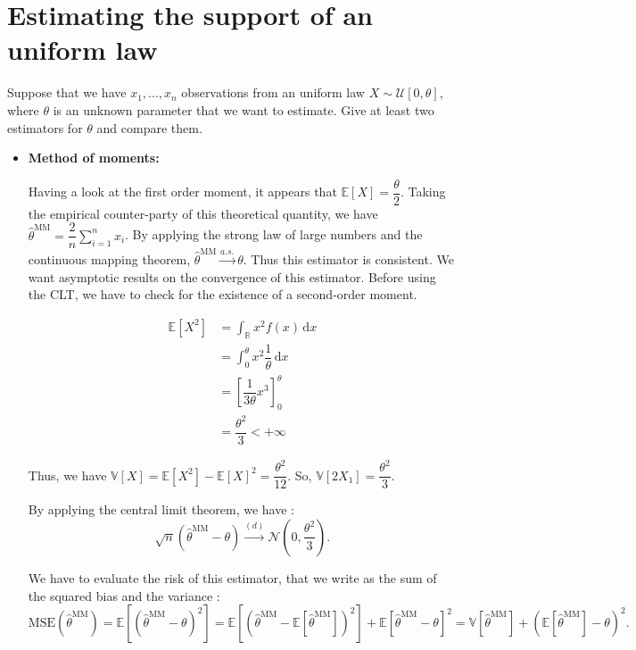 \section{Estimating the support of an uniform law}

\begin{tcolorbox}[width=\linewidth, sharp corners=all, colback=white!95!black]
Suppose that we have $x_1,\dots,x_n$ observations from an uniform law $X \sim \mathcal{U}[0,\theta]$, where $\theta$ is an unknown parameter that we want to estimate. Give at least two estimators for $\theta$ and compare them.
\end{tcolorbox}

\begin{itemize}

\item \textbf{Method of moments:}

Having a look at the first order moment, it appears that $\mathbb{E}[X] = \dfrac{\theta}{2}$. Taking the empirical counter-party of this theoretical quantity, we have $\hat{\theta}^{\text{MM}} = \dfrac{2}{n}\sum\limits_{i=1}^n x_i$.\newline
By applying the strong law of large numbers and the continuous mapping theorem, $\hat{\theta}^{\text{MM}} \xrightarrow{a.s.} \theta$. Thus this estimator is consistent.\newline
We want asymptotic results on the convergence of this estimator. Before using the CLT, we have to check for the existence of a second-order moment.

\begin{align*}
    \mathbb{E}[X^2] &= \displaystyle \int_{\mathbb{R}} x^2 f(x) \, \mathrm{d}x \\
    &= \displaystyle \int_{0}^{\theta} x^2 \dfrac{1}{\theta} \, \mathrm{d}x \\
    &= \left[ \dfrac{1}{3\theta}x^3 \right]^\theta_0 \\
    &= \dfrac{\theta^2}{3} < +\infty
\end{align*}

Thus, we have $\mathbb{V}[X] = \mathbb{E}[X^2] - \mathbb{E}[X]^2 = \dfrac{\theta^2}{12}$. So, $\mathbb{V}[2X_1]  = \dfrac{\theta^2}{3}$.\newline

By applying the central limit theorem, we have : $$\sqrt{n}(\hat{\theta}^{\text{MM}} - \theta) \xrightarrow{(d)} \mathcal{N}\left(0, \dfrac{\theta^2}{3}\right).$$

We have to evaluate the risk of this estimator, that we write as the sum of the squared bias and the variance : $$\text{MSE}(\hat{\theta}^{\text{MM}}) = \mathbb{E}[(\hat{\theta}^{\text{MM}} - \theta)^2] = \mathbb{E}[(\hat{\theta}^{\text{MM}} - \mathbb{E}[\hat{\theta}^{\text{MM}}])^2] + \mathbb{E}[\hat{\theta}^{\text{MM}} - \theta]^2 = \mathbb{V}[\hat{\theta}^{\text{MM}}] + (\mathbb{E}[\hat{\theta}^{\text{MM}}] - \theta)^2.$$


\end{itemize}
